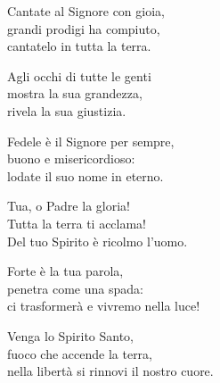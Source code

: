 

\spazio

\strofa Cantate al Signore con gioia,\\
grandi prodigi ha compiuto,\\
cantatelo in tutta la terra.

\spazio


\spazio

\strofa Agli occhi di tutte le genti\\
mostra la sua grandezza,\\
rivela la sua giustizia.

\spazio


\spazio

\strofa Fedele è il Signore per sempre,\\
buono e misericordioso:\\
lodate il suo nome in eterno.

\spazio


\spazio

\strofa Tua, o Padre la gloria!\\
Tutta la terra ti acclama!\\
Del tuo Spirito è ricolmo l'uomo.

\spazio


\spazio

\strofa Forte è la tua parola,\\
penetra come una spada:\\
ci trasformerà e vivremo nella luce!

\spazio


\spazio

\strofa Venga lo Spirito Santo,\\
fuoco che accende la terra,\\
nella libertà si rinnovi il nostro cuore.

\spazio

